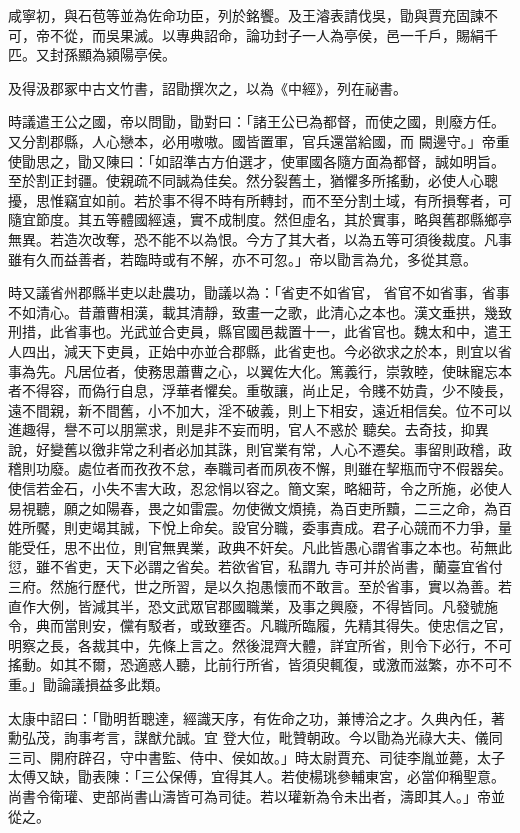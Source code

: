 \begin{pinyinscope}
 咸寧初，與石苞等並為佐命功臣，列於銘饗。及王濬表請伐吳，勖與賈充固諫不可，帝不從，而吳果滅。以專典詔命，論功封子一人為亭侯，邑一千戶，賜絹千匹。又封孫顯為潁陽亭侯。



 及得汲郡冢中古文竹書，詔勖撰次之，以為《中經》，列在祕書。



 時議遣王公之國，帝以問勖，勖對曰：「諸王公已為都督，而使之國，則廢方任。又分割郡縣，人心戀本，必用嗷嗷。國皆置軍，官兵還當給國，而
 闕邊守。」帝重使勖思之，勖又陳曰：「如詔準古方伯選才，使軍國各隨方面為都督，誠如明旨。至於割正封疆。使親疏不同誠為佳矣。然分裂舊土，猶懼多所搖動，必使人心聰擾，思惟竊宜如前。若於事不得不時有所轉封，而不至分割土域，有所損奪者，可隨宜節度。其五等體國經遠，實不成制度。然但虛名，其於實事，略與舊郡縣鄉亭無異。若造次改奪，恐不能不以為恨。今方了其大者，以為五等可須後裁度。凡事雖有久而益善者，若臨時或有不解，亦不可忽。」帝以勖言為允，多從其意。



 時又議省州郡縣半吏以赴農功，勖議以為：「省吏不如省官，
 省官不如省事，省事不如清心。昔蕭曹相漢，載其清靜，致畫一之歌，此清心之本也。漢文垂拱，幾致刑措，此省事也。光武並合吏員，縣官國邑裁置十一，此省官也。魏太和中，遣王人四出，減天下吏員，正始中亦並合郡縣，此省吏也。今必欲求之於本，則宜以省事為先。凡居位者，使務思蕭曹之心，以翼佐大化。篤義行，崇敦睦，使昧寵忘本者不得容，而偽行自息，浮華者懼矣。重敬讓，尚止足，令賤不妨貴，少不陵長，遠不間親，新不間舊，小不加大，淫不破義，則上下相安，遠近相信矣。位不可以進趣得，譽不可以朋黨求，則是非不妄而明，官人不惑於
 聽矣。去奇技，抑異說，好變舊以徼非常之利者必加其誅，則官業有常，人心不遷矣。事留則政稽，政稽則功廢。處位者而孜孜不怠，奉職司者而夙夜不懈，則雖在挈瓶而守不假器矣。使信若金石，小失不害大政，忍忿悁以容之。簡文案，略細苛，令之所施，必使人易視聽，願之如陽春，畏之如雷震。勿使微文煩撓，為百吏所黷，二三之命，為百姓所饜，則吏竭其誠，下悅上命矣。設官分職，委事責成。君子心競而不力爭，量能受任，思不出位，則官無異業，政典不奸矣。凡此皆愚心謂省事之本也。茍無此愆，雖不省吏，天下必謂之省矣。若欲省官，私謂九
 寺可并於尚書，蘭臺宜省付三府。然施行歷代，世之所習，是以久抱愚懷而不敢言。至於省事，實以為善。若直作大例，皆減其半，恐文武眾官郡國職業，及事之興廢，不得皆同。凡發號施令，典而當則安，儻有駁者，或致壅否。凡職所臨履，先精其得失。使忠信之官，明察之長，各裁其中，先條上言之。然後混齊大體，詳宜所省，則令下必行，不可搖動。如其不爾，恐適惑人聽，比前行所省，皆須臾輒復，或激而滋繁，亦不可不重。」勖論議損益多此類。



 太康中詔曰：「勖明哲聰達，經識天序，有佐命之功，兼博洽之才。久典內任，著勳弘茂，詢事考言，謀猷允誠。宜
 登大位，毗贊朝政。今以勖為光祿大夫、儀同三司、開府辟召，守中書監、侍中、侯如故。」時太尉賈充、司徒李胤並薨，太子太傅又缺，勖表陳：「三公保傅，宜得其人。若使楊珧參輔東宮，必當仰稱聖意。尚書令衛瓘、吏部尚書山濤皆可為司徒。若以瓘新為令未出者，濤即其人。」帝並從之。




\end{pinyinscope}
